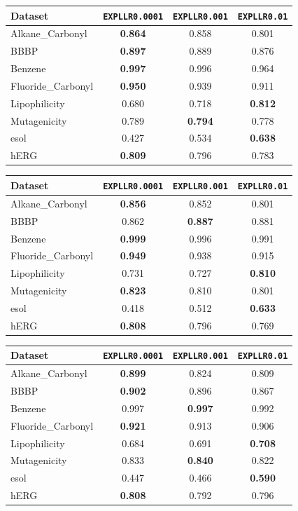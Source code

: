 \scriptsize
\begin{tabular}{lccc}
\hline
Dataset & \texttt{EXPLLR0.0001} & \texttt{EXPLLR0.001} & \texttt{EXPLLR0.01} \\ \hline
Alkane_Carbonyl & \textbf{0.864} & 0.858 & 0.801 \\
BBBP & \textbf{0.897} & 0.889 & 0.876 \\
Benzene & \textbf{0.997} & 0.996 & 0.964 \\
Fluoride_Carbonyl & \textbf{0.950} & 0.939 & 0.911 \\
Lipophilicity & 0.680 & 0.718 & \textbf{0.812} \\
Mutagenicity & 0.789 & \textbf{0.794} & 0.778 \\
esol & 0.427 & 0.534 & \textbf{0.638} \\
hERG & \textbf{0.809} & 0.796 & 0.783 \\
\hline
\end{tabular}


\scriptsize
\begin{tabular}{lccc}
\hline
Dataset & \texttt{EXPLLR0.0001} & \texttt{EXPLLR0.001} & \texttt{EXPLLR0.01} \\ \hline
Alkane_Carbonyl & \textbf{0.856} & 0.852 & 0.801 \\
BBBP & 0.862 & \textbf{0.887} & 0.881 \\
Benzene & \textbf{0.999} & 0.996 & 0.991 \\
Fluoride_Carbonyl & \textbf{0.949} & 0.938 & 0.915 \\
Lipophilicity & 0.731 & 0.727 & \textbf{0.810} \\
Mutagenicity & \textbf{0.823} & 0.810 & 0.801 \\
esol & 0.418 & 0.512 & \textbf{0.633} \\
hERG & \textbf{0.808} & 0.796 & 0.769 \\
\hline
\end{tabular}


\scriptsize
\begin{tabular}{lccc}
\hline
Dataset & \texttt{EXPLLR0.0001} & \texttt{EXPLLR0.001} & \texttt{EXPLLR0.01} \\ \hline
Alkane_Carbonyl & \textbf{0.899} & 0.824 & 0.809 \\
BBBP & \textbf{0.902} & 0.896 & 0.867 \\
Benzene & 0.997 & \textbf{0.997} & 0.992 \\
Fluoride_Carbonyl & \textbf{0.921} & 0.913 & 0.906 \\
Lipophilicity & 0.684 & 0.691 & \textbf{0.708} \\
Mutagenicity & 0.833 & \textbf{0.840} & 0.822 \\
esol & 0.447 & 0.466 & \textbf{0.590} \\
hERG & \textbf{0.808} & 0.792 & 0.796 \\
\hline
\end{tabular}


